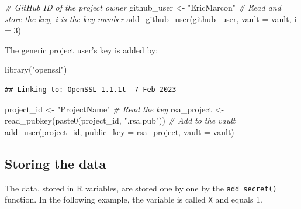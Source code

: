\documentclass[
  12pt,
  american,
  a4paper,
  extrafontsizes,onecolumn,openright
  ]{memoir}
\newenvironment{Shaded}{\begin{snugshade}}{\end{snugshade}}
\newcommand{\AttributeTok}[1]{\textcolor[rgb]{0.77,0.63,0.00}{#1}}
\newcommand{\CommentTok}[1]{\textcolor[rgb]{0.56,0.35,0.01}{\textit{#1}}}
\newcommand{\DecValTok}[1]{\textcolor[rgb]{0.00,0.00,0.81}{#1}}
\newcommand{\FunctionTok}[1]{\textcolor[rgb]{0.00,0.00,0.00}{#1}}
\newcommand{\NormalTok}[1]{#1}
\newcommand{\OtherTok}[1]{\textcolor[rgb]{0.56,0.35,0.01}{#1}}
\newcommand{\StringTok}[1]{\textcolor[rgb]{0.31,0.60,0.02}{#1}}
\begin{document}
\begin{Shaded}
\begin{Highlighting}[]
\CommentTok{\# GitHub ID of the project owner}
\NormalTok{github\_user }\OtherTok{\textless{}{-}} \StringTok{"EricMarcon"}
\CommentTok{\# Read and store the key, i is the key number}
\FunctionTok{add\_github\_user}\NormalTok{(github\_user, }\AttributeTok{vault =}\NormalTok{ vault, }\AttributeTok{i =} \DecValTok{3}\NormalTok{)}
\end{Highlighting}
\end{Shaded}

\normalsize

The generic project user's key is added by:

\scriptsize

\begin{Shaded}
\begin{Highlighting}[]
\FunctionTok{library}\NormalTok{(}\StringTok{"openssl"}\NormalTok{)}
\end{Highlighting}
\end{Shaded}

\begin{verbatim}
## Linking to: OpenSSL 1.1.1t  7 Feb 2023
\end{verbatim}

\begin{Shaded}
\begin{Highlighting}[]
\NormalTok{project\_id }\OtherTok{\textless{}{-}} \StringTok{"ProjectName"}
\CommentTok{\# Read the key}
\NormalTok{rsa\_project }\OtherTok{\textless{}{-}} \FunctionTok{read\_pubkey}\NormalTok{(}\FunctionTok{paste0}\NormalTok{(project\_id, }\StringTok{".rsa.pub"}\NormalTok{))}
\CommentTok{\# Add to the vault}
\FunctionTok{add\_user}\NormalTok{(project\_id, }\AttributeTok{public\_key =}\NormalTok{ rsa\_project, }\AttributeTok{vault =}\NormalTok{ vault)}
\end{Highlighting}
\end{Shaded}

\normalsize

\hypertarget{storing-the-data}{%
\subsection{Storing the data}\label{storing-the-data}}

The data, stored in R variables, are stored one by one by the \texttt{add\_secret()} function.
In the following example, the variable is called \texttt{X} and equals 1.
\end{document}
